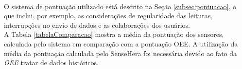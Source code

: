 \begin{center}
\label{tabelaOEE}
\end{center}

\\\null \quad O sistema de pontuação utilizado está descrito na Seção \ref{subsec:pontuacao}, o que inclui, por exemplo, as considerações de regularidade das leituras, interrupções no envio de dados e as colaborações dos usuários.
\\\null \quad A Tabela \ref{tabelaComparacao} mostra a média da pontuação dos sensores, calculada pelo sistema em comparação com a pontuação \acrshort{OEE}. A utilização da média da pontuação calculada pelo SenseHera foi necessária devido ao fato da \textit{\acrlong{OEE}} tratar de dados históricos.

